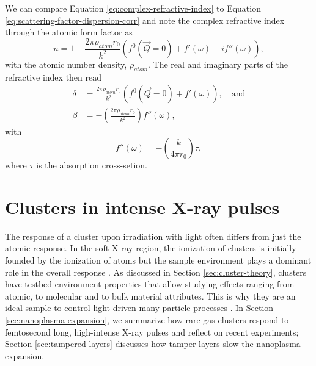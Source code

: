 %
We can compare Equation \eqref{eq:complex-refractive-index} to Equation \eqref{eq:scattering-factor-dispersion-corr} and note the complex refractive index through the atomic form factor as \citep{Als-Nielson-2011-JWS}
\begin{equation}
n= 1- \frac{2\pi \rho_{atom}r_{0}}{k^{2}}\left(f^{0}\left(\vec{Q}=0\right)+f'\left(\omega\right)+i f''\left(\omega\right)\right),
\label{eq:eq:complex-refractive-index-atomic-factors}
\end{equation}
with the atomic number density, $\rho_{atom}$. The real and imaginary parts of the refractive index then read
\begin{align}
\delta &= \frac{2 \pi \rho_{atom} r_{0}}{k^{2}}\left(f^{0}\left(\vec{Q}=0\right)+f'\left(\omega\right)\right),\quad \text{and}\\
\beta &= - \left(\frac{2\pi \rho_{atom}r_{0}}{k^{2}}\right)f''\left(\omega\right),
\label{eq:delta-and-beta}
\end{align}
with
\begin{equation}
f''\left(\omega\right)=-\left(\frac{k}{4\pi r_{0}}\right)\tau,
\label{eq:f-2-definition}
\end{equation}
where $\tau$ is the absorption cross-setion.
%
%
%
%
%
%
%
\section{Clusters in intense X-ray pulses}\label{sec:ionizatin-of-ext-obj}
The response of a cluster upon irradiation with light often differs from just the atomic response. In the soft X-ray region, the ionization of clusters is initially founded by the ionization of atoms but the sample environment plays a dominant role in the overall response \cite{Schorb-2012-PRL,Ferguson-2016-SciAdv}. As discussed in Section \ref{sec:cluster-theory}, clusters have testbed environment properties that allow studying effects ranging from atomic, to molecular and to bulk material attributes. This is why they are an ideal sample to control light-driven many-particle processes \citep{Fennel-2010-RMP}. In Section \ref{sec:nanoplasma-expansion}, we summarize how rare-gas clusters respond to femtosecond long, high-intense X-ray pulses and reflect on recent experiments; Section \ref{sec:tampered-layers} discusses how tamper layers slow the nanoplasma expansion.
%
%
%
